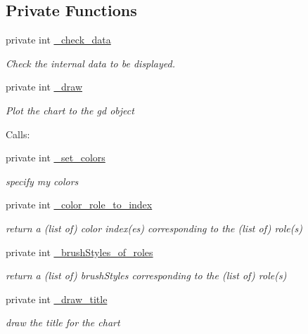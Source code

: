 \subsection*{Private Functions}
\label{_amgrp8d29cff216bafa3117e21883ea7c6b5f}
 \begin{DoxyCompactItemize}
\item 
private int \hyperlink{classChart_1_1Base_a13296be5b92a9880851977fe0abfdf01}{\_\-check\_\-data}
\begin{DoxyCompactList}\small\item\em Check the internal data to be displayed. \item\end{DoxyCompactList}\item 
private int \hyperlink{classChart_1_1Base_ab021c0dceb1ae55e1697bbee667480fa}{\_\-draw}
\begin{DoxyCompactList}\small\item\em Plot the chart to the gd object\par
 Calls: \item\end{DoxyCompactList}\item 
private int \hyperlink{classChart_1_1Base_addecc110eb46a126acaad69e113d06ea}{\_\-set\_\-colors}
\begin{DoxyCompactList}\small\item\em specify my colors \item\end{DoxyCompactList}\item 
private int \hyperlink{classChart_1_1Base_a14098e898b9f9b5dca8d7a39ab9d4d57}{\_\-color\_\-role\_\-to\_\-index}
\begin{DoxyCompactList}\small\item\em return a (list of) color index(es) corresponding to the (list of) role(s) \item\end{DoxyCompactList}\item 
private int \hyperlink{classChart_1_1Base_a2c02f66668131d6567338965e821d87a}{\_\-brushStyles\_\-of\_\-roles}
\begin{DoxyCompactList}\small\item\em return a (list of) brushStyles corresponding to the (list of) role(s) \item\end{DoxyCompactList}\item 
private int \hyperlink{classChart_1_1Base_aa3467472a4c4a598c5a2f64de8c438c1}{\_\-draw\_\-title}
\begin{DoxyCompactList}\small\item\em draw the title for the chart \item\end{DoxyCompactList}\item 

\end{DoxyCompactItemize}
